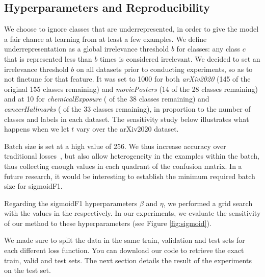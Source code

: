 
\subsection{Hyperparameters and Reproducibility}

We choose to ignore classes that are underrepresented, in order to give the model a fair chance at learning from at least a few examples. We define underrepresentation as a global irrelevance threshold $b$ for classes: any class $c$ that is represented less than $b$ times is considered irrelevant. We decided to set an irrelevance threshold $b$ on all datasets prior to conducting experiments, so as to not finetune for that feature. It was set to 1000 for both \emph{arXiv2020} (145 of the original 155 classes remaining) and \emph{moviePosters} (14 of the 28 classes remaining) and at 10 for \emph{chemicalExposure} ( of the 38 classes remaining) and \emph{cancerHallmarks} ( of the 33 classes remaining), in proportion to the number of classes and labels in each dataset. The sensitivity study below illustrates what happens when we let $t$ vary over the arXiv2020 dataset.

Batch size is set at a high value of 256. We thus increase accuracy over traditional losses~\cite{bigBS}, but also allow heterogeneity in the examples within the batch, thus collecting enough values in each quadrant of the confusion matrix. In a future research, it would be interesting to establish the minimum required batch size for sigmoidF1.  

Regarding the sigmoidF1 hyperparameters $\beta$ and $\eta$, we performed a grid search with the values in the   respectively. In our experiments, we evaluate the sensitivity of our method to these hyperparameters (see Figure \ref{fig:sigmoid}).

We made sure to split the data in the same train, validation and test sets for each different loss function. You can download our code to retrieve the exact train, valid and test sets. The next section details the result of the experiments on the test set.

